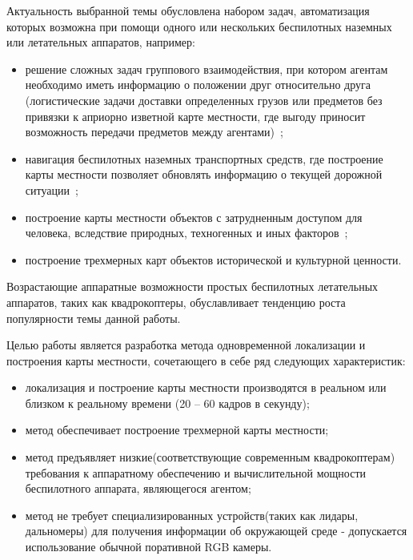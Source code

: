 Актуальность выбранной темы обусловлена набором задач, автоматизация которых возможна при помощи одного или нескольких беспилотных наземных или летательных аппаратов, например:
\begin{itemize}
    \item решение сложных задач группового взаимодействия, при котором агентам необходимо иметь информацию о положении друг относительно друга (логистические задачи доставки определенных грузов или предметов без привязки к априорно изветной карте местности, где выгоду приносит возможность передачи предметов между агентами)~\cite{beerSLAM};
    \item навигация беспилотных наземных транспортных средств, где построение карты местности позволяет обновлять информацию о текущей дорожной ситуации~\cite{kittiDataset};
    \item построение карты местности объектов с затрудненным доступом для человека, вследствие природных, техногенных и иных факторов~\cite{tum3DMonoSLAM};
    \item построение трехмерных карт объектов исторической и культурной ценности.
\end{itemize}
Возрастающие аппаратные возможности простых беспилотных летательных аппаратов, таких как квадрокоптеры, обуславливает тенденцию роста~\cite{tum3DMonoSLAM} популярности темы данной работы.


Целью работы является разработка метода одновременной локализации и построения карты местности, сочетающего в себе ряд следующих характеристик:
\begin{itemize}
    \item локализация и построение карты местности производятся в реальном или близком к реальному времени (20 -- 60 кадров в секунду);
    \item метод обеспечивает построение трехмерной карты местности;
    \item метод предъявляет низкие(соответствующие современным квадрокоптерам) требования к аппаратному обеспечению и вычислительной мощности беспилотного аппарата, являющегося агентом;
    \item метод не требует специализированных устройств(таких как лидары, дальномеры) для получения информации об окружающей среде - допускается использование обычной поративной RGB камеры.
\end{itemize}
 

